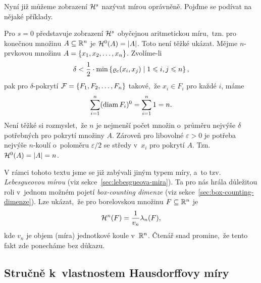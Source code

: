 Nyní již můžeme zobrazení $\mathcal{H}^{s}$ nazývat mírou oprávněně. Pojďme se podívat na nějaké příklady.
\begin{example}
    Pro $s=0$ představuje zobrazení $\mathcal{H}^{s}$ obyčejnou aritmetickou míru,~tzn. pro konečnou množinu $A\subseteq\mathbb{R}^n$ je $\mathcal{H}^{0}(A)=|A|$. Toto není těžké ukázat. Mějme $n$-prvkovou množinu $A=\left\{x_1,x_2,\ldots,x_n\right\}$. Zvolíme-li
    \[\delta<\dfrac{1}{2}\cdot\min\left\{\varrho_e(x_i,x_j)\mid 1\leqslant i,j\leqslant n\right\},\]
    pak pro $\delta$-pokrytí $\mathcal{F}=\left\{F_1,F_2,\ldots,F_n\right\}$ takové,~že $x_i\in F_i$ pro každé $i$, máme
    \[\sum_{i=1}^{n}(\operatorname{diam}{F_i})^0=\sum_{i=1}^{n}1=n.\]
    Není těžké si rozmyslet,~že $n$ je nejmenší počet množin o~průměru nejvýše $\delta$ potřebných pro pokrytí množiny $A$. Zároveň pro libovolné $\varepsilon>0$ je potřeba nejvýše $n$-koulí o~poloměru $\varepsilon/2$ se středy v~$x_i$ pro pokrytí $A$. Tzn.~$\mathcal{H}^{0}(A)=|A|=n$.
\end{example}

V rámci tohoto textu jsme se již zabývali jiným typem míry, a~to tzv. \emph{Lebesgueovou mírou} (viz sekce~\ref{sec:lebesgueova-mira}). Ta pro nás hrála důležitou roli v~jednom možném pojetí \emph{box-counting dimenze} (viz sekce~\ref{sec:box-counting-dimenze}). Lze ukázat,~že pro borelovskou množinu $F\subseteq\mathbb{R}^n$ je
\[\mathcal{H}^{n}(F)=\dfrac{1}{v_n}\lambda_n(F),\]
kde $v_n$ je objem (míra) jednotkové koule v~$\mathbb{R}^n$. Čtenář snad promine,~že tento fakt zde ponecháme bez důkazu. \citep[str. 45]{Falconer2014}

\subsection{Stručně k~vlastnostem Hausdorffovy míry}\label{subsec:vlastnosti-hausdorffovy-miry}

